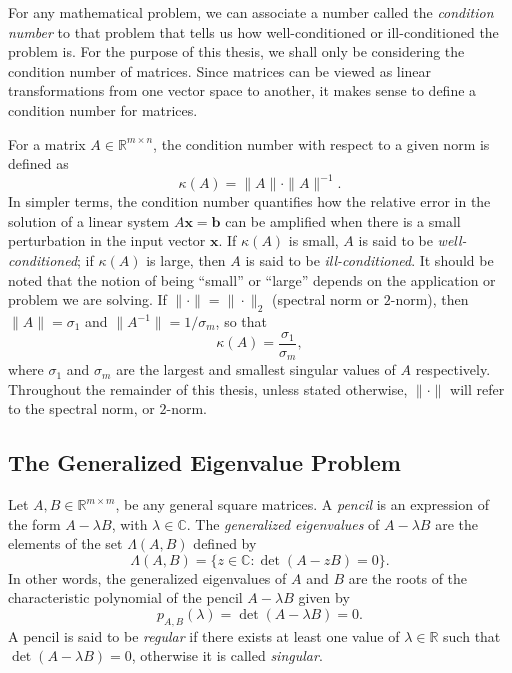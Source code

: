 For any mathematical problem, we can associate a number called the \textit{condition number} to that problem that tells us how well-conditioned or ill-conditioned the problem is. For the purpose of this thesis, we shall only be considering the condition number of matrices. Since matrices can be viewed as linear transformations from one vector space to another, it makes sense to define a condition number for matrices.

For a matrix $A \in \mathbb{R}^{m\times n}$, the condition number with respect to a given norm is defined as
\begin{equation}\label{eq:ConditionNoOfAMatrix}
	\kappa(A) = \|A\| \cdot \|A\|^{-1}.
\end{equation}
In simpler terms, the condition number quantifies how the relative error in the solution of a linear system $A\mathbf{x} = \mathbf{b}$ can be amplified when there is a small perturbation in the input vector $\mathbf{x}$. If $\kappa(A)$ is small, $A$ is said to be \textit{well-conditioned}; if $\kappa(A)$ is large, then $A$ is said to be \textit{ill-conditioned}. It should be noted that the notion of being ``small'' or ``large'' depends on the application or problem we are solving. If $\| \cdot\| = \| \cdot \|_2$ (spectral norm or $2$-norm), then $\|A\| = \sigma_1$ and $\| A^{-1} \| = 1/\sigma_m$, so that
\begin{equation}\label{eq:ConditionNoWithSingularVal}
	\kappa(A) = \frac{\sigma_1}{\sigma_m},
\end{equation}
where $\sigma_1$ and $\sigma_m$ are the largest and smallest singular values of $A$ respectively. Throughout the remainder of this thesis, unless stated otherwise, $\| \cdot \|$ will refer to the spectral norm, or $2$-norm.

\subsection{The Generalized Eigenvalue Problem}\label{sec:GeneralizedEigValProblem}

Let $A, B \in \mathbb{R}^{m\times m}$, be any general square matrices. A \textit{pencil} is an expression of the form $A - \lambda B$, with $\lambda \in \mathbb{C}$. The \textit{generalized eigenvalues} of $A - \lambda B$ are the elements of the set $\Lambda(A, B)$ defined by
\begin{equation}\label{eq:GeneralizedEigValDefinition}
	\Lambda(A, B) = \{z \in \mathbb{C}: \det(A-zB) = 0\}.
\end{equation}
In other words, the generalized eigenvalues of $A$ and $B$ are the roots of the characteristic polynomial of the pencil $A- \lambda B$ given by
\begin{equation}\label{eq:GeneralizedXteristicPolynomial}
	p_{A, B}(\lambda) = \det(A-\lambda B) = 0.
\end{equation}
A pencil is said to be \textit{regular} if there exists at least one value of $\lambda \in \mathbb{R}$ such that $\det(A-\lambda B) = 0$, otherwise it is called \textit{singular}.

